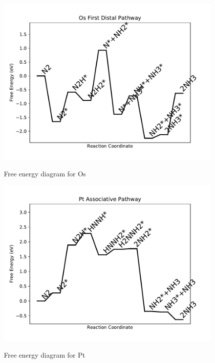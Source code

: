 \documentclass[journal=jacsat,manuscript=article]{achemso}
\begin{document}
\begin{figure}
\includegraphics[width=1\linewidth]{data/plots/Os_distal_1.pdf}
\label{fig:Os_distal_1}
\caption{Free energy diagram for Os}
\end{figure}

\newpage
\begin{figure}
\includegraphics[width=1\linewidth]{data/plots/Pt_associative.pdf}
\label{fig:Pt_associative}
\caption{Free energy diagram for Pt}
\end{figure}
\end{document}
